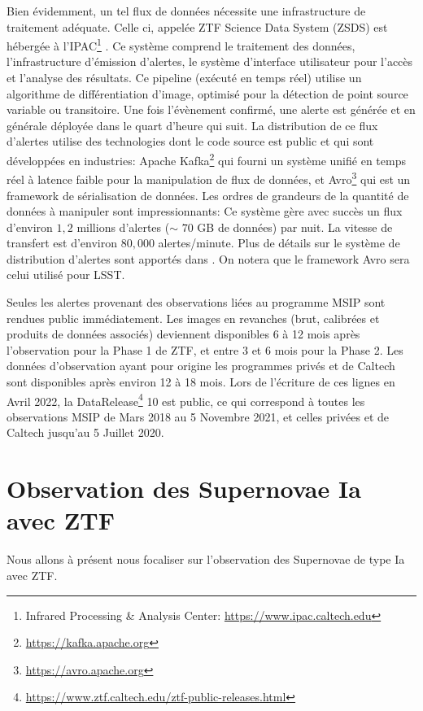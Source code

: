 \documentclass[../main/main.tex]{subfiles}
\begin{document}
Bien évidemment, un tel flux de données nécessite une infrastructure de
traitement adéquate. Celle ci, appelée ZTF Science Data System (ZSDS)
est hébergée à l'IPAC\footnote{Infrared Processing \& Analysis Center: \href{https://
www.ipac.caltech.edu}{https://www.ipac.caltech.edu}} \citep{MasciZTF2019}. Ce système
comprend le traitement des données, l'infrastructure
d'émission d'alertes, le système d'interface utilisateur pour l'accès
et l'analyse des résultats. Ce pipeline (exécuté en temps réel) utilise
un algorithme de différentiation d'image, optimisé pour la détection de
point source variable ou transitoire. Une fois l'évènement confirmé, une alerte est générée et
en générale déployée dans le quart d'heure qui suit. La distribution de
ce flux d'alertes utilise des technologies dont le code source est
public et qui sont développées
en industries: Apache Kafka\footnote{\url{https://kafka.apache.org}} qui
fourni un système unifié en temps réel à latence faible pour la
manipulation de flux de données, et
Avro\footnote{\url{https://avro.apache.org}} qui est un framework de
sérialisation de données. Les ordres de grandeurs de la quantité de
données à manipuler sont impressionnants: Ce système gère avec succès un
flux d'environ $1,2$ millions d'alertes ($\sim$ $70$ GB de données) par
nuit. La vitesse de transfert est d'environ $80,000$ alertes/minute. Plus
de détails sur le système de distribution d'alertes sont apportés dans
\citet{PattersonZTF2019}. On notera que le framework Avro sera celui utilisé
pour LSST.

Seules les alertes provenant des observations liées au programme MSIP
sont rendues public immédiatement. Les images en revanches (brut,
calibrées et produits de données associés) deviennent disponibles 6 à 12 mois 
après l'observation pour la Phase 1 de ZTF, et entre 3 et 6 mois pour la
Phase 2. Les données d'observation ayant pour origine les programmes
privés et de Caltech sont disponibles après environ 12 à 18 mois. Lors
de l'écriture de ces lignes en Avril 2022, la
DataRelease\footnote{\url{https://www.ztf.caltech.edu/ztf-public-releases.html}}
10 est public, ce qui correspond à toutes les observations MSIP de Mars 2018 au 5 Novembre
2021, et celles privées et de Caltech jusqu'au 5 Juillet 2020.

\section{Observation des Supernovae Ia avec ZTF}\label{sec:sniaztf}

Nous allons à présent nous focaliser sur l'observation des Supernovae de
type Ia avec ZTF.
\end{document}
